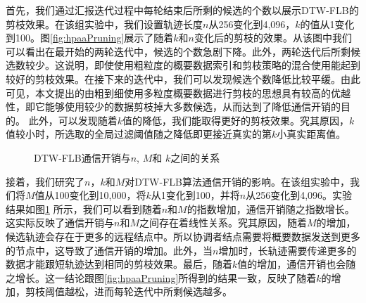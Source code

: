   首先，我们通过汇报迭代过程中每轮结束后所剩的候选的个数以展示DTW-FLB的剪枝效果。在该组实验中，我们设置轨迹长度$n$从256变化到4,096，$k$的值从1变化到100。图\ref{fig:hpaaPruning}展示了随着$k$和$n$变化后的剪枝的效果。从该图中我们可以看出在最开始的两轮迭代中，候选的个数急剧下降。此外，两轮迭代后所剩候选数较少。这说明，即使使用粗粒度的概要数据索引和剪枝策略的混合使用能起到较好的剪枝效果。在接下来的迭代中，我们可以发现候选个数降低比较平缓。由此可见，本文提出的由粗到细使用多粒度概要数据进行剪枝的思想具有较高的优越性，即它能够使用较少的数据剪枝掉大多数候选，从而达到了降低通信开销的目的。
  此外，可以发现随着$k$值的降低，我们能取得更好的剪枝效果。究其原因，$k$值较小时，所选取的全局过滤阈值随之降低即更接近真实的第$k$小真实距离值。
  
  \begin{figure}
  	\centering
  	\caption{DTW-FLB通信开销与$n$, $M$和 $k$之间的关系}
  	\label{fig:hpaaKMn}
  \end{figure}
  
  接着，我们研究了$n$，$k$和$M$对DTW-FLB算法通信开销的影响。在该组实验中，我们将$M$值从100变化到10,000，将$k$从1变化到100，并将$n$从256变化到4,096。实验结果如图\ref{fig:hpaaKMn} 所示，我们可以看到随着$n$和$M$的指数增加，通信开销随之指数增长。这实际反映了通信开销与$n$和$M$之间存在着线性关系。究其原因，随着$M$的增加，候选轨迹会存在于更多的远程结点中。所以协调者结点需要将概要数据发送到更多的节点中，这导致了通信开销的增加。此外，当$n$增加时，长轨迹需要传递更多的数据才能跟短轨迹达到相同的剪枝效果。最后，随着$k$值的增加，通信开销也会随之增长。这一结论跟图\ref{fig:hpaaPruning}所得到的结果一致，反映了随着$k$的增加，剪枝阈值越松，进而每轮迭代中所剩候选越多。
  
